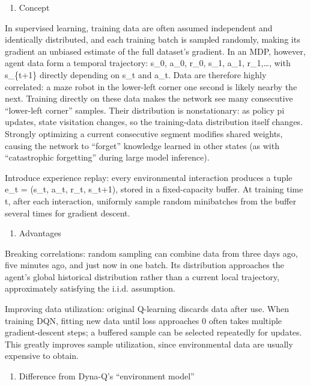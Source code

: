\begin{enumerate}
\def\labelenumi{\arabic{enumi}.}
\tightlist
\item
  Concept
\end{enumerate}

In supervised learning, training data are often assumed independent and identically distributed, and each training batch is sampled randomly, making its gradient an unbiased estimate of the full dataset's gradient. In an MDP, however, agent data form a temporal trajectory: s\_0, a\_0, r\_0, s\_1, a\_1, r\_1,\ldots, with s\_\{t+1\} directly depending on s\_t and a\_t. Data are therefore highly correlated: a maze robot in the lower-left corner one second is likely nearby the next. Training directly on these data makes the network see many consecutive ``lower-left corner'' samples. Their distribution is nonstationary: as policy pi updates, state visitation changes, so the training-data distribution itself changes. Strongly optimizing a current consecutive segment modifies shared weights, causing the network to ``forget'' knowledge learned in other states (as with ``catastrophic forgetting'' during large model inference).

Introduce experience replay: every environmental interaction produces a tuple e\_t = (s\_t, a\_t, r\_t, s\_t+1), stored in a fixed-capacity buffer. At training time t, after each interaction, uniformly sample random minibatches from the buffer several times for gradient descent.

\begin{enumerate}
\def\labelenumi{\arabic{enumi}.}
\setcounter{enumi}{1}
\tightlist
\item
  Advantages
\end{enumerate}

Breaking correlations: random sampling can combine data from three days ago, five minutes ago, and just now in one batch. Its distribution approaches the agent's global historical distribution rather than a current local trajectory, approximately satisfying the i.i.d. assumption.

Improving data utilization: original Q-learning discards data after use. When training DQN, fitting new data until loss approaches 0 often takes multiple gradient-descent steps; a buffered sample can be selected repeatedly for updates. This greatly improves sample utilization, since environmental data are usually expensive to obtain.

\begin{enumerate}
\def\labelenumi{\arabic{enumi}.}
\setcounter{enumi}{2}
\tightlist
\item
  Difference from Dyna-Q's ``environment model''
\end{enumerate}


